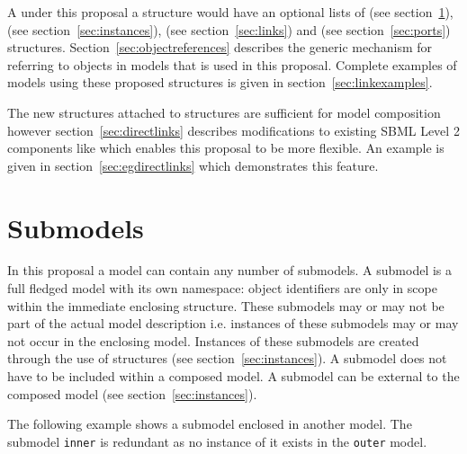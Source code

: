 \documentclass{cekarticle}
\begin{document}
A under this proposal a  structure would have an optional lists of
 (see section~\ref{sec:submodels}),
 (see section~\ref{sec:instances}),
 (see section~\ref{sec:links})
and  (see section~\ref{sec:ports}) structures.
Section~\ref{sec:objectreferences} describes the
generic mechanism for referring to objects in models that is used in this
proposal.
Complete examples of models using these proposed structures is given in section~\ref{sec:linkexamples}.

The new structures attached to  structures are sufficient for model composition however section~\ref{sec:directlinks}
describes modifications to existing SBML Level 2 components like 
which enables this proposal to be more flexible.  An example is given in section~\ref{sec:egdirectlinks} which
demonstrates this feature.

\section{Submodels}
\label{sec:submodels}

In this proposal a model can contain any number of submodels.  A submodel is a full
fledged model with its own namespace: object identifiers are only in scope within the
immediate enclosing  structure. These submodels may or may not be part
of the actual model description i.e. instances of these submodels may or may not
occur in the enclosing model.  Instances of these submodels are created through the
use of  structures (see section~\ref{sec:instances}). A submodel does
not have to be included within a composed model.  A submodel can be external to the
composed model (see section~\ref{sec:instances}). 

The following example shows a submodel enclosed in another model.  The submodel \texttt{inner} is redundant as no instance
of it exists in the \texttt{outer} model.

\pagebreak
\end{document}
